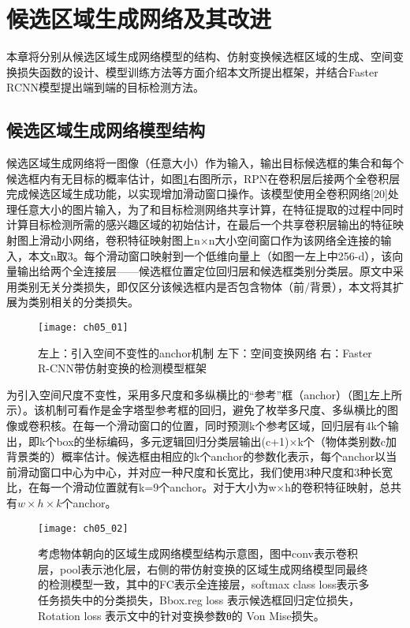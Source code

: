 
\section{候选区域生成网络及其改进}
 
本章将分别从候选区域生成网络模型的结构、仿射变换候选框区域的生成、空间变换损失函数的设计、模型训练方法等方面介绍本文所提出框架，并结合Faster RCNN模型提出端到端的目标检测方法。
\subsection{候选区域生成网络模型结构}

候选区域生成网络将一图像（任意大小）作为输入，输出目标候选框的集合和每个候选框内有无目标的概率估计，如图\ref{fig:ch05_01}右图所示，RPN在卷积层后接两个全卷积层完成候选区域生成功能，以实现增加滑动窗口操作。该模型使用全卷积网络[20]处理任意大小的图片输入，为了和目标检测网络\citep{Girshick2015b}共享计算，在特征提取的过程中同时计算目标检测所需的感兴趣区域的初始估计，在最后一个共享卷积层输出的特征映射图上滑动小网络，卷积特征映射图上n×n大小空间窗口作为该网络全连接的输入，本文n取3。每个滑动窗口映射到一个低维向量上（如图一左上中256-d），该向量输出给两个全连接层——候选框位置定位回归层和候选框类别分类层。原文中采用类别无关分类损失，即仅区分该候选框内是否包含物体（前/背景），本文将其扩展为类别相关的分类损失。
\begin{figure}[!htbp]
\centering
\texttt{[image: ch05\_01]}
\caption{左上：引入空间不变性的anchor机制  左下：空间变换网络  右：Faster R-CNN带仿射变换的检测模型框架}
\label{fig:ch05_01}
\end{figure}

为引入空间尺度不变性，采用多尺度和多纵横比的“参考”框（anchor）（图\ref{fig:ch05_01}左上所示）。该机制可看作是金字塔型参考框的回归，避免了枚举多尺度、多纵横比的图像或卷积核。在每一个滑动窗口的位置，同时预测k个参考区域，回归层有4k个输出，即k个box的坐标编码，多元逻辑回归分类层输出(c+1)×k个（物体类别数c加背景类的）概率估计。候选框由相应的k个anchor的参数化表示，每个anchor以当前滑动窗口中心为中心，并对应一种尺度和长宽比，我们使用3种尺度和3种长宽比，在每一个滑动位置就有k=9个anchor。对于大小为w×h的卷积特征映射，总共有$w×h×k$个anchor。
\begin{figure}[!htbp]
\centering
\texttt{[image: ch05\_02]}
\caption{考虑物体朝向的区域生成网络模型结构示意图，图中conv表示卷积层，pool表示池化层，右侧的带仿射变换的区域生成网络模型同最终的检测模型一致，其中的FC表示全连接层，softmax class loss表示多任务损失中的分类损失，Bbox.reg loss 表示候选框回归定位损失，Rotation loss 表示文中的针对变换参数θ的 Von Mise损失。}
\label{fig:ch05_02}
\end{figure} 

